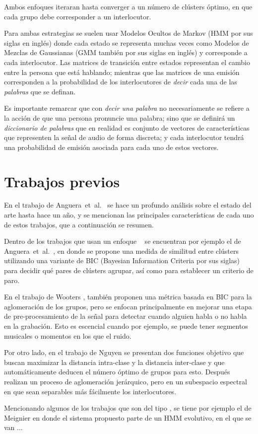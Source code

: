 Ambos enfoques iteraran hasta converger a un número de clústers óptimo, en que cada grupo debe corresponder a un interlocutor.

Para ambas estrategias se suelen usar Modelos Ocultos de Markov (HMM por sus siglas en inglés) donde cada estado se representa muchas veces como Modelos de Mezclas de Gaussianas (GMM también por sus siglas en inglés) y corresponde a cada interlocutor. Las matrices de transición entre estados representan el cambio entre la persona que está hablando; mientras que las matrices de una emisión corresponden a la probabilidad de los interlocutores de \textit{decir} cada una de las \textit{palabras} que se definan.

Es importante remarcar que con \textit{decir una palabra} no necesariamente se refiere a la acción de que una persona pronuncie una palabra; sino que se definirá un \textit{diccionario de palabras} que en realidad es conjunto de vectores de características que representen la señal de audio de forma discreta; y cada interlocutor tendrá una probabilidad de emisión asociada para cada uno de estos vectores.

\section{Trabajos previos}

En el trabajo de Anguera~et~al.~\cite{AngueraMiro2012} se hace un profundo análisis sobre el estado del arte hasta hace un año, y se mencionan las principales características de cada uno de estos trabajos, que a continuación se resumen.

Dentro de los trabajos que usan un enfoque \bu~ se encuentran por ejemplo el de Anguera~et~al.~\cite{AngueraMiro2006}, en donde se propone una medida de similitud entre clústers utilizando una variante de BIC (Bayesian Information Criteria por sus siglas) para decidir qué pares de clústers agrupar, así como para establecer un criterio de paro.

En el trabajo de Wooters \cite{Wooters2007}, también proponen una métrica basada en BIC para la aglomeración de los grupos, pero se enfocan principalmente en mejorar una etapa de pre-procesamiento de la señal para detectar cuando alguien habla o no habla en la grabación. Esto es escencial cuando por ejemplo, se puede tener segmentos musicales o momentos en los que el ruido.

Por otro lado, en el trabajo de Nguyen \cite{Nguyen2009} se presentan dos funciones objetivo que buscan maximizar la distancia intra-clase y la distancia inter-clase y que automáticamente deducen el número óptimo de grupos para esto. Después realizan un proceso de aglomeración jerárquico, pero en un subespacio espectral en que sean separables más fácilmente los interlocutores.

Mencionando algunos de los trabajos que son del tipo \td, se tiene por ejemplo el de Meignier \cite{Meignier2001} en donde el sistema propuesto parte de un HMM evolutivo, en el que se van ...



